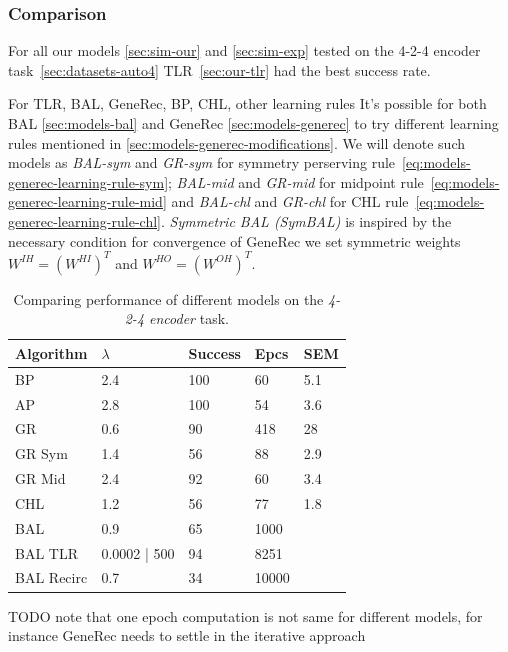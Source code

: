 \subsubsection{Comparison} 
\label{sec:tlr-auto4-cmp} 

For all our models \ref{sec:sim-our} and \ref{sec:sim-exp} tested on the 4-2-4 encoder task~\ref{sec:datasets-auto4} TLR~\ref{sec:our-tlr} had the best success rate. 

For TLR, BAL, GeneRec, BP, CHL, other learning rules
\label{sec:our-learning-rules}
It's possible for both BAL \ref{sec:models-bal} and GeneRec \ref{sec:models-generec} to try different learning rules mentioned in \ref{sec:models-generec-modifications}. We will denote such models as \emph{BAL-sym} and \emph{GR-sym} for symmetry perserving rule~\ref{eq:models-generec-learning-rule-sym}; \emph{BAL-mid} and \emph{GR-mid} for midpoint rule~\ref{eq:models-generec-learning-rule-mid} and \emph{BAL-chl} and \emph{GR-chl} for CHL rule~\ref{eq:models-generec-learning-rule-chl}. 
\label{sec:our-bal-sym} 
\emph{Symmetric BAL (SymBAL)} is inspired by the necessary condition for convergence of GeneRec \citep{o1996bio} we set symmetric weights $W^{IH} = (W^{HI})^T$ and $W^{HO} = (W^{OH})^T$. 

\begin{table}
  \centering
    \begin{tabular}{|l|l|l|l|l|}
    \hline
    Algorithm&$\lambda$&Success&Epcs&SEM \\
    \hline
    BP&2.4&100&60&5.1\\
    \hline
    AP&2.8&100&54&3.6\\
    \hline
    GR&0.6&90&418&28\\
    \hline
    GR Sym&1.4&56&88&2.9\\
    \hline
    GR Mid&2.4&92&60&3.4\\
    \hline
    CHL&1.2&56&77&1.8\\
    \hline
    BAL&0.9&65&1000&\\
    \hline
    BAL TLR&0.0002 | 500&94&8251&\\
    \hline
    BAL Recirc&0.7&34&10000&\\
    \hline
    \end{tabular}
  \caption{Comparing performance of different models on the \emph{4-2-4 encoder} task.} 
  \label{tab:results-cmp-auto4}
\end{table}

TODO note that one epoch computation is not same for different models, for instance GeneRec needs to settle in the iterative approach 

